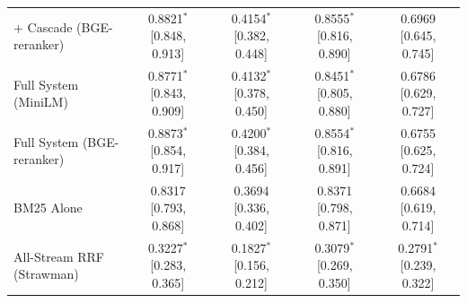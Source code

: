 \documentclass[conference]{IEEEtran}
\begin{document}
\begin{table}[t]
{\begin{tabular}{lcccc}
+ Cascade (BGE-reranker)        & 0.8821$^*$ [0.848, 0.913] & 0.4154$^*$ [0.382, 0.448] & 0.8555$^*$ [0.816, 0.890] & 0.6969 [0.645, 0.745] \\
Full System (MiniLM)            & 0.8771$^*$ [0.843, 0.909] & 0.4132$^*$ [0.378, 0.450] & 0.8451$^*$ [0.805, 0.880] & 0.6786 [0.629, 0.727] \\
Full System (BGE-reranker)      & 0.8873$^*$ [0.854, 0.917] & 0.4200$^*$ [0.384, 0.456] & 0.8554$^*$ [0.816, 0.891] & 0.6755 [0.625, 0.724] \\
\midrule
BM25 Alone                      & 0.8317 [0.793, 0.868] & 0.3694 [0.336, 0.402] & 0.8371 [0.798, 0.871] & 0.6684 [0.619, 0.714] \\
All-Stream RRF (Strawman)       & 0.3227$^*$ [0.283, 0.365] & 0.1827$^*$ [0.156, 0.212] & 0.3079$^*$ [0.269, 0.350] & 0.2791$^*$ [0.239, 0.322] \\
\bottomrule
\end{tabular}}
\end{table}
\end{document}
